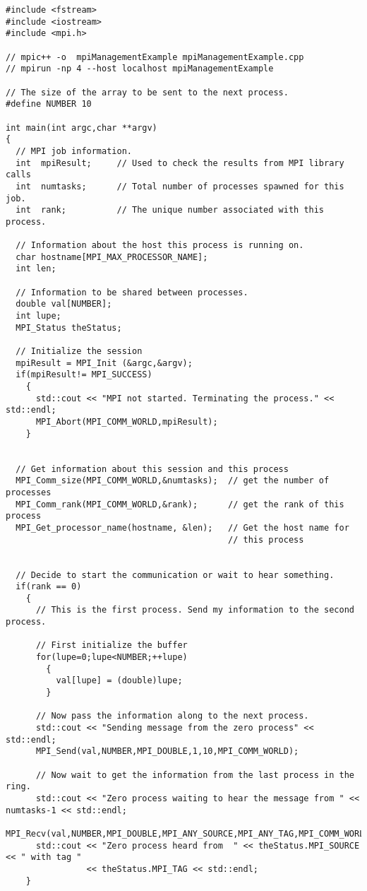 \begin{lstlisting}[caption={Example of blocking communication.},
                   basicstyle=\scriptsize,
                   label=listing:blockingCommunication]
#include <fstream>
#include <iostream>
#include <mpi.h>

// mpic++ -o  mpiManagementExample mpiManagementExample.cpp 
// mpirun -np 4 --host localhost mpiManagementExample

// The size of the array to be sent to the next process.
#define NUMBER 10

int main(int argc,char **argv)
{
  // MPI job information.
  int  mpiResult;     // Used to check the results from MPI library calls
  int  numtasks;      // Total number of processes spawned for this job.
  int  rank;          // The unique number associated with this process.

  // Information about the host this process is running on.
  char hostname[MPI_MAX_PROCESSOR_NAME]; 
  int len;

  // Information to be shared between processes.
  double val[NUMBER];
  int lupe;
  MPI_Status theStatus;

  // Initialize the session
  mpiResult = MPI_Init (&argc,&argv);
  if(mpiResult!= MPI_SUCCESS)
    {
      std::cout << "MPI not started. Terminating the process." << std::endl;
      MPI_Abort(MPI_COMM_WORLD,mpiResult);
    }


  // Get information about this session and this process 
  MPI_Comm_size(MPI_COMM_WORLD,&numtasks);  // get the number of processes
  MPI_Comm_rank(MPI_COMM_WORLD,&rank);      // get the rank of this process
  MPI_Get_processor_name(hostname, &len);   // Get the host name for
                                            // this process


  // Decide to start the communication or wait to hear something.
  if(rank == 0)
    {
      // This is the first process. Send my information to the second process.

      // First initialize the buffer
      for(lupe=0;lupe<NUMBER;++lupe)
        {
          val[lupe] = (double)lupe;
        }

      // Now pass the information along to the next process.
      std::cout << "Sending message from the zero process" << std::endl;
      MPI_Send(val,NUMBER,MPI_DOUBLE,1,10,MPI_COMM_WORLD);

      // Now wait to get the information from the last process in the ring.
      std::cout << "Zero process waiting to hear the message from " << numtasks-1 << std::endl;
      MPI_Recv(val,NUMBER,MPI_DOUBLE,MPI_ANY_SOURCE,MPI_ANY_TAG,MPI_COMM_WORLD,&theStatus);
      std::cout << "Zero process heard from  " << theStatus.MPI_SOURCE << " with tag " 
                << theStatus.MPI_TAG << std::endl;
    }


\end{lstlisting}
